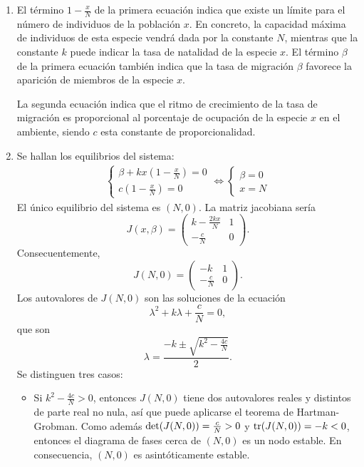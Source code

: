 \documentclass[11pt]{report}
\begin{document}
\begin{solution}
    \hfill
    \begin{enumerate}
        \item El término $1-\frac{x}{N}$ de la primera ecuación indica que existe un límite para el número de individuos de la población $x$. En concreto, la capacidad máxima de individuos de esta especie vendrá dada por la constante $N$, mientras que la constante $k$ puede indicar la tasa de natalidad de la especie $x$. El término $\beta$ de la primera ecuación también indica que la tasa de migración $\beta$ favorece la aparición de miembros de la especie $x$. 
        
        La segunda ecuación indica que el ritmo de crecimiento de la tasa de migración es proporcional al porcentaje de ocupación de la especie $x$ en el ambiente, siendo $c$ esta constante de proporcionalidad.
        \item Se hallan los equilibrios del sistema:
        \begin{align*}
            \begin{cases}
                \beta + kx(1-\frac{x}{N}) = 0 \\
                c(1-\frac{x}{N}) = 0
            \end{cases} \iff
            \begin{cases}
                \beta = 0 \\
                x = N
            \end{cases}
        \end{align*}
        El único equilibrio del sistema es $(N,0)$. La matriz jacobiana sería
        \[J(x,\beta)=\left(\begin{array}{cc}
            k-\frac{2kx}{N} & 1 \\
            -\frac{c}{N} & 0
        \end{array}\right).\]
        Consecuentemente,
        \[J(N,0)=\left(\begin{array}{cc}
            -k & 1 \\
            -\frac{c}{N} & 0
        \end{array}\right).\]
        Los autovalores de $J(N,0)$ son las soluciones de la ecuación
        \[\lambda^2+k\lambda+\frac{c}{N}=0,\]
        que son
        \[\lambda = \frac{-k\pm\sqrt{k^2-\frac{4c}{N}}}{2}.\]
        Se distinguen tres casos:
        \begin{itemize}
            \item Si $k^2-\frac{4c}{N} > 0$, entonces $J(N,0)$ tiene dos autovalores reales y distintos de parte real no nula, así que puede aplicarse el teorema de Hartman-Grobman. Como además $\textup{det}(J(N,0)) = \frac{c}{N} > 0$ y $\textup{tr}(J(N,0)) = -k < 0$, entonces el diagrama de fases cerca de $(N,0)$ es un nodo estable. En consecuencia, $(N,0)$ es asintóticamente estable.

\end{itemize}
\end{enumerate}
\end{solution}
\end{document}
